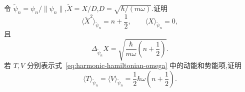 \begin{exercise}[激发态的期望值]\label{ex:harmonic-expectations}
令 \(\widetilde\psi_{n}=\psi_{n}/\|\psi_{n}\|\),\(\widetilde X=X/D\),\(D=\sqrt{\hbar/(m\omega)}\).证明
\[
\langle\widetilde X^{2}\rangle_{\widetilde\psi_{n}}=n+\frac12,
\qquad
\langle X\rangle_{\widetilde\psi_{n}}=0,
\]
且
\[
\Delta_{\widetilde\psi_{n}}X=\sqrt{\frac{\hbar}{m\omega}\left(n+\frac12\right)}.
\]
若 \(T,V\) 分别表示式~\eqref{eq:harmonic-hamiltonian-omega} 中的动能和势能项,证明
\[
\langle T\rangle_{\widetilde\psi_{n}}=\langle V\rangle_{\widetilde\psi_{n}}
=\frac12\hbar\omega\left(n+\frac12\right).
\]
\end{exercise}

